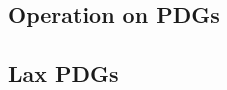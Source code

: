 \documentclass[the-pdg-manual.tex]{subfiles}
\begin{document}
	\subsection{Operation on PDGs}
	\subsection{Lax PDGs}
\end{document}
